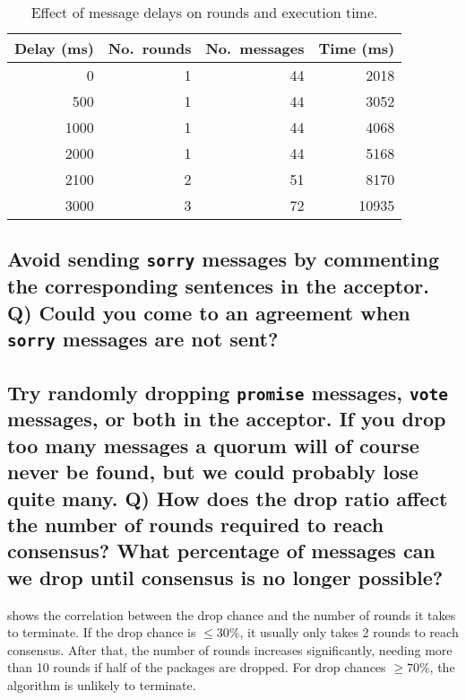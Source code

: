 \documentclass[a4paper, 10pt]{article}
\begin{document}
\begin{table}[htp]
\centering
\caption{Effect of message delays on rounds and execution time.}
\label{tab:delays}
\begin{tabular}{rrrr}
\toprule
Delay (ms)\! & No.~rounds & No.~messages & Time (ms)\! \\ \midrule
0            & 1          & 44           & 2018        \\
500          & 1          & 44           & 3052        \\
1000         & 1          & 44           & 4068        \\
2000         & 1          & 44           & 5168        \\
2100         & 2          & 51           & 8170        \\
3000         & 3          & 72           & 10935       \\ \bottomrule
\end{tabular}
\end{table}

\subsection{Avoid sending \texttt{sorry} messages by commenting the corresponding sentences in the acceptor. Q) Could you come to an agreement when \texttt{sorry} messages are not sent?}

\subsection{\!Try randomly dropping \texttt{promise} messages, \texttt{vote} messages, or both in the acceptor. If you drop too many messages a quorum will of course never be found, but we could probably lose quite many. Q) How does the drop ratio affect the number of rounds required to reach consensus? What percentage of messages can we drop until consensus is no longer possible?}

 shows the correlation between the drop chance and the number of rounds it takes to terminate.
If the drop chance is \(\leq 30\%\), it usually only takes 2 rounds to reach consensus.
After that, the number of rounds increases significantly, needing more than 10 rounds if half of the packages are dropped.
For drop chances \(\geq 70\%\), the algorithm is unlikely to terminate.
\end{document}
